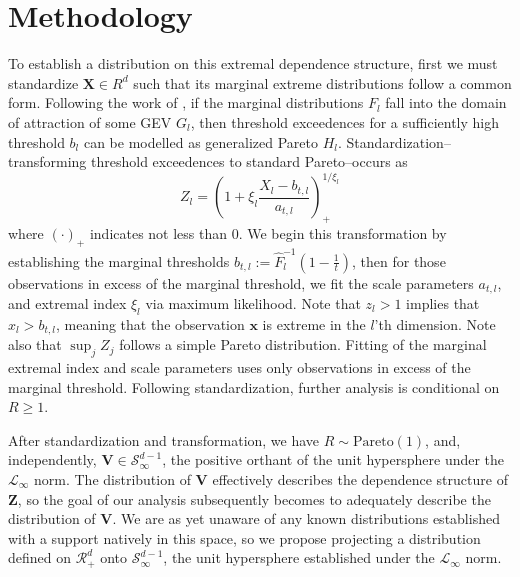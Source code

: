 \section{Methodology}
To establish a distribution on this extremal dependence structure, first we must standardize $\bm{X} \in R^d$
  such that its marginal extreme distributions follow a common form.  Following the work of
  \cite{ferreira2014}, if the marginal distributions $F_{l}$ fall into the domain
  of attraction of some GEV $G_l$, then threshold exceedences for a sufficiently high threshold $b_{l}$
  can be modelled as generalized Pareto $H_l$.  Standardization--transforming threshold exceedences to
  standard Pareto--occurs as
  \begin{equation}
    \label{eqn:standardization}
    Z_l = \left(1 + \xi_l\frac{X_l - b_{t,l}}{a_{t,l}}\right)_{+}^{1/\xi_l}
  \end{equation}
  where $(\cdot)_{+}$ indicates not less than 0. We begin this transformation by establishing the
  marginal thresholds $b_{t,l} := \hat{F}_l^{-1}\left(1 - \frac{1}{t}\right)$, then for those observations
  in excess of the marginal threshold, we fit the scale parameters $a_{t,l}$, and extremal index $\xi_l$
  via maximum likelihood. Note that $z_l > 1$ implies that $x_l > b_{t,l}$, meaning that the observation
  $\bm{x}$ is extreme in the $l$'th dimension.  Note also that $\sup_j Z_j$ follows a simple Pareto
  distribution. Fitting of the marginal extremal index and scale parameters uses only observations in
  excess of the marginal threshold. Following standardization, further analysis is conditional on
  $R \geq 1$.

After standardization and transformation, we have $R\sim\text{Pareto}(1)$, and, independently,
  $\bm{V}\in\mathcal{S}_{\infty}^{d-1}$, the positive orthant of the unit hypersphere under the
  $\mathcal{L}_{\infty}$ norm.  The distribution of $\bm{V}$ effectively describes the dependence
  structure of $\bm{Z}$, so the goal of our analysis subsequently becomes to adequately describe the
  distribution of $\bm{V}$.  We are as yet unaware of any known distributions established with a support
  natively in this space, so we propose projecting a distribution defined on $\mathcal{R}_{+}^{d}$ onto
  $\mathcal{S}_{\infty}^{d-1}$, the unit hypersphere established under the $\mathcal{L}_{\infty}$ norm.







